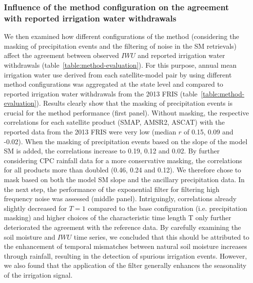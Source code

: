 \documentclass[hess, manuscript]{copernicus}
\begin{document}
\subsubsection{Influence of the method configuration on the agreement with reported irrigation water withdrawals}
\label{ssec:method-configuration}
We then examined how different configurations of the method (considering the masking of precipitation events and the filtering of noise in the SM retrievals) affect the agreement between observed $IWU$ and reported irrigation water withdrawals (table~\ref{table:method-evaluation}). For this purpose, annual mean irrigation water use derived from each satellite-model pair by using different method configurations was aggregated at the state level and compared to reported irrigation water withdrawals from the 2013 FRIS \citep{fris2013} (table~\ref{table:method-evaluation}). Results clearly show that the masking of precipitation events is crucial for the method performance (first panel). Without masking, the respective correlations for each satellite product (SMAP, AMSR2, ASCAT) with the reported data from the 2013 FRIS were very low (median $r$ of 0.15, 0.09 and -0.02). When the masking of precipitation events based on the slope of the model SM is added, the correlations increase to 0.19, 0.12 and 0.02. By further considering CPC rainfall data for a more conservative masking, the correlations for all products more than doubled (0.46, 0.24 and 0.12). We therefore chose to mask based on both the model SM slope and the ancillary precipitation data. In the next step, the performance of the exponential filter for filtering high frequency noise was assessed (middle panel). Intriguingly, correlations already slightly decreased for $T=1$ compared to the base configuration (i.e. precipitation masking) and higher choices of the characteristic time length T only further deteriorated the agreement with the reference data. By carefully examining the soil moisture and $IWU$ time series, we concluded that this should be attributed to the enhancement of temporal mismatches between natural soil moisture increases through rainfall, resulting in the detection of spurious irrigation events. However, we also found that the application of the filter generally enhances the seasonality of the irrigation signal.\\
\end{document}
